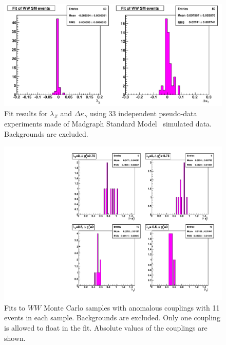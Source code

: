\begin{figure}[tp]
  \centerline{
    \includegraphics[width=1.0\textwidth]{figures/fit_ww_mc_1D_2}
  }

  \caption[1D fits to WW SM Monte Carlo] {Fit results for
  $\lambda_{Z}$ and $\Delta\kappa_\gamma$ using 33 independent pseudo-data
  experiments made of Madgraph Standard Model \ww\ simulated
  data. Backgrounds are excluded.}

\label{fig:fit_ww_mc_1D_2}
\end{figure}




\begin{figure}[tp]
  \centerline{
    \includegraphics[width=1.0\textwidth]{figures/fit_wwATGC_mc_1D_abs}
  }

  \caption[1D fits to WW aTGC Monte Carlo] {Fits to $WW$ Monte Carlo
    samples with anomalous couplings with 11 events in each sample. Backgrounds
    are excluded. Only one coupling is allowed to float in the fit. Absolute
    values of the couplings are shown.}
  \label{fig:fit_wwATGC_mc_1D_abs}
\end{figure}


